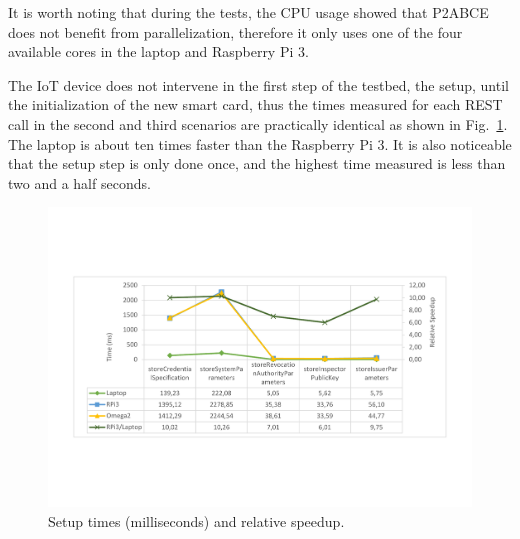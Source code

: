 It is worth noting that during the tests, the CPU usage showed that P2ABCE does not benefit from parallelization, therefore it only uses one of the four available cores in the laptop and Raspberry Pi 3.

\hfil

The IoT device does not intervene in the first step of the testbed, the setup, until the initialization of the new smart card, thus the times measured for each REST call in the second and third scenarios are practically identical as shown in Fig.~\ref{fig:setup:graph}. The laptop is about ten times faster than the Raspberry Pi 3. It is also noticeable that the setup step is only done once, and the highest time measured is less than two and a half seconds.

\begin{figure}[bth]
	\includegraphics[width=\linewidth]{gfx/graphics/SetupGraphTable}
	\caption{Setup times (milliseconds) and relative speedup.}
	\label{fig:setup:graph}
\end{figure}




\hfil

